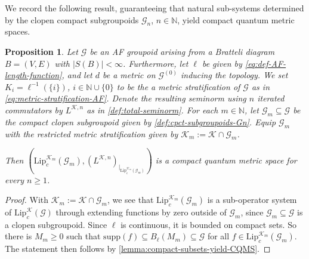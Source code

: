 \documentclass[11pt,a4paper,oneside,final,reqno]{amsart}
\newtheorem{proposition}[lemma]{Proposition}
\theoremstyle{definition}
\newcommand{\G}{\mathcal{G}}
\newcommand{\Go}{\mathcal{G}^{(0)}}
\newcommand{\cK}{\mathcal{K}}
\newcommand{\supp}{\mathrm{supp}}
\newcommand{\Lip}{\mathrm{Lip}}
\newcommand{\N}{\mathbb{N}}
\numberwithin{equation}{section}
\begin{document}
	We record the following result, guaranteeing that natural sub-systems determined by the clopen compact subgroupoids $\G_n$, $n \in \N$, yield compact quantum metric spaces.

	\begin{proposition}\label{prop:CQMS-from-compact-AF-subgroupoid}
		Let $\G$ be an AF groupoid arising from a Bratteli diagram $B = (V,E)$ with $\vert S(B)\vert < \infty$. Furthermore, let $\ell$ be given by \eqref{eq:def-AF-length-function}, and let $d$ be a metric on $\Go$ inducing the topology. 
		We set $K_i = \ell^{-1}(\{i\})$, $i \in \N \cup \{0\}$ to be the a metric stratification of $\G$ as in \eqref{eq:metric-stratification-AF}.
		Denote the resulting seminorm using $n$ iterated commutators by $ L^{\cK, n}$ as in \cref{def:total-seminorm}. 
		For each $m \in \N$, let $\G_m \subseteq \G$ be the compact clopen subgroupoid given by \eqref{def:cpct-subgroupoids-Gn}. 
		Equip $\G_m$ with the restricted metric stratification given by $\cK_{m} := \cK \cap \G_m$. 
		
		Then $(\Lip_c^{\cK_m}(\G_m), (L^{\cK, n})_{\vert_{\Lip_c^{\cK_m}(\G_m)}})$ is a compact quantum metric space for every $n\geq 1$.
	\end{proposition}
	
	\begin{proof}
		With $\cK_{m} := \cK \cap \G_m$, we see that $\Lip_c^{\cK_m}(\G_m)$ is a sub-operator system of 
		$\Lip_c^{\cK}(\G)$
		through extending functions by zero outside of $\G_m$, since $\G_m \subseteq \G$ is a clopen subgroupoid. Since $\ell$ is continuous, it is bounded on compact sets. So there is $M_m \geq 0$ such that $\supp (f) \subseteq B_{\ell}(M_m) \subseteq \G$ for all $f \in \Lip_c^{\cK_m}(\G_m)$. The statement then follows by \cref{lemma:compact-subsets-yield-CQMS}. 
	\end{proof}
	
\end{document}
